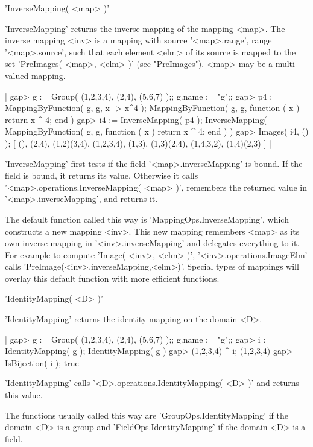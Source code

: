 
'InverseMapping( <map> )'

'InverseMapping' returns the inverse mapping of  the  mapping <map>.  The
inverse mapping  <inv>  is  a  mapping  with source  '<map>.range', range
'<map>.source', such that each element <elm> of its source  is  mapped to
the  set 'PreImages( <map>, <elm> )'  (see "PreImages").  <map> may  be a
multi valued mapping.

|    gap> g := Group( (1,2,3,4), (2,4), (5,6,7) );;  g.name := "g";;
    gap> p4 := MappingByFunction( g, g, x -> x^4 );
    MappingByFunction( g, g, function ( x )
        return x ^ 4;
    end )
    gap> i4 := InverseMapping( p4 );
    InverseMapping( MappingByFunction( g, g, function ( x )
        return x ^ 4;
    end ) )
    gap> Images( i4, () );
    [ (), (2,4), (1,2)(3,4), (1,2,3,4), (1,3), (1,3)(2,4), (1,4,3,2),
      (1,4)(2,3) ] |

'InverseMapping'  first tests   if  the  field '<map>.inverseMapping'  is
bound.  If the field is bound, it  returns its value.  Otherwise it calls
'<map>.operations.InverseMapping( <map> )',  remembers the returned value
in '<map>.inverseMapping', and returns it.

The default function   called  this  way is  'MappingOps.InverseMapping',
which constructs a new  mapping <inv>.   This new mapping remembers <map>
as its    own inverse mapping   in '<inv>.inverseMapping'   and delegates
everything to  it.   For  example  to  compute  'Image( <inv>,  <elm> )',
'<inv>.operations.ImageElm' calls 'PreImage(<inv>.inverseMapping,<elm>)'.
Special types of mappings will  overlay this  default function with  more
efficient functions.


'IdentityMapping( <D> )'

'IdentityMapping' returns the identity mapping on the domain <D>.

|    gap> g := Group( (1,2,3,4), (2,4), (5,6,7) );;  g.name := "g";;
    gap> i := IdentityMapping( g );
    IdentityMapping( g )
    gap> (1,2,3,4) ^ i;
    (1,2,3,4)
    gap> IsBijection( i );
    true |

'IdentityMapping'  calls   '<D>.operations.IdentityMapping(  <D>  )'  and
returns this value.

The functions usually called  this way  are 'GroupOps.IdentityMapping' if
the domain  <D> is a group and  'FieldOps.IdentityMapping'  if the domain
<D> is a field.

